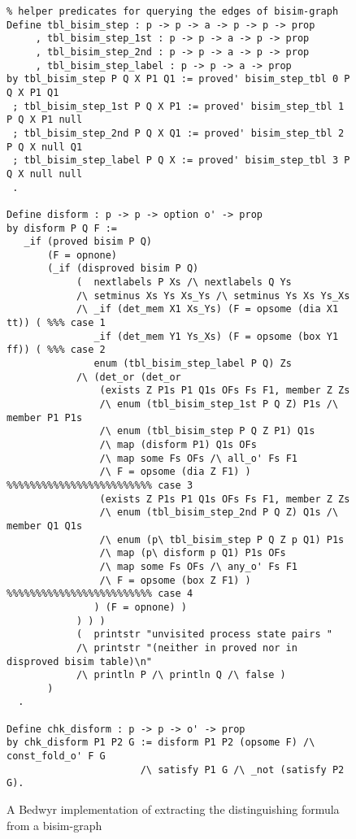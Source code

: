 \documentclass{llncs}
\begin{document}
\begin{figure}
\begin{verbatim}
% helper predicates for querying the edges of bisim-graph
Define tbl_bisim_step : p -> p -> a -> p -> p -> prop
     , tbl_bisim_step_1st : p -> p -> a -> p -> prop
     , tbl_bisim_step_2nd : p -> p -> a -> p -> prop
     , tbl_bisim_step_label : p -> p -> a -> prop
by tbl_bisim_step P Q X P1 Q1 := proved' bisim_step_tbl 0 P Q X P1 Q1
 ; tbl_bisim_step_1st P Q X P1 := proved' bisim_step_tbl 1 P Q X P1 null
 ; tbl_bisim_step_2nd P Q X Q1 := proved' bisim_step_tbl 2 P Q X null Q1
 ; tbl_bisim_step_label P Q X := proved' bisim_step_tbl 3 P Q X null null
 .

Define disform : p -> p -> option o' -> prop
by disform P Q F :=
   _if (proved bisim P Q)
       (F = opnone)
       (_if (disproved bisim P Q)
            (  nextlabels P Xs /\ nextlabels Q Ys
            /\ setminus Xs Ys Xs_Ys /\ setminus Ys Xs Ys_Xs
            /\ _if (det_mem X1 Xs_Ys) (F = opsome (dia X1 tt)) ( %%% case 1
               _if (det_mem Y1 Ys_Xs) (F = opsome (box Y1 ff)) ( %%% case 2
               enum (tbl_bisim_step_label P Q) Zs
            /\ (det_or (det_or
                (exists Z P1s P1 Q1s OFs Fs F1, member Z Zs
                /\ enum (tbl_bisim_step_1st P Q Z) P1s /\ member P1 P1s
                /\ enum (tbl_bisim_step P Q Z P1) Q1s
                /\ map (disform P1) Q1s OFs
                /\ map some Fs OFs /\ all_o' Fs F1
                /\ F = opsome (dia Z F1) ) %%%%%%%%%%%%%%%%%%%%%%%%% case 3
                (exists Z P1s P1 Q1s OFs Fs F1, member Z Zs
                /\ enum (tbl_bisim_step_2nd P Q Z) Q1s /\ member Q1 Q1s 
                /\ enum (p\ tbl_bisim_step P Q Z p Q1) P1s
                /\ map (p\ disform p Q1) P1s OFs
                /\ map some Fs OFs /\ any_o' Fs F1
                /\ F = opsome (box Z F1) ) %%%%%%%%%%%%%%%%%%%%%%%%% case 4
               ) (F = opnone) )
            ) ) )
            (  printstr "unvisited process state pairs "
            /\ printstr "(neither in proved nor in disproved bisim table)\n"
            /\ println P /\ println Q /\ false )
       )
  .

Define chk_disform : p -> p -> o' -> prop
by chk_disform P1 P2 G := disform P1 P2 (opsome F) /\ const_fold_o' F G
                       /\ satisfy P1 G /\ _not (satisfy P2 G).
\end{verbatim}
\caption{A Bedwyr implementation of extracting the distinguishing formula
  from a bisim-graph}
\end{figure}
\end{document}
